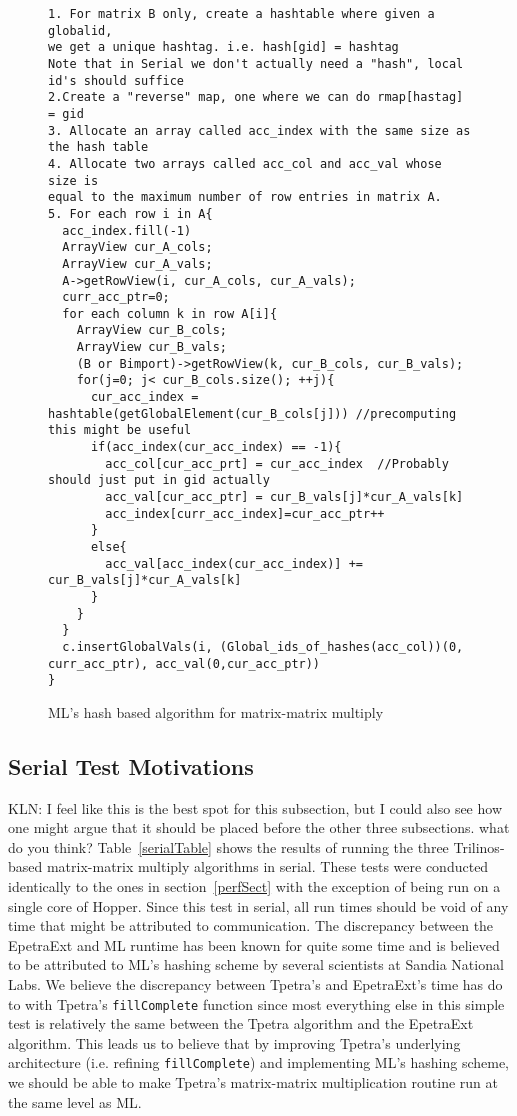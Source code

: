 \documentclass[pdf,12pt, strict]{SANDreport}
\newcommand{\KLN}[1]{\textcolor{klnBlue}{KLN: #1}}
\begin{document}
\begin{figure}
\centering
{\footnotesize
\begin{verbatim}
1. For matrix B only, create a hashtable where given a globalid, 
we get a unique hashtag. i.e. hash[gid] = hashtag
Note that in Serial we don't actually need a "hash", local id's should suffice
2.Create a "reverse" map, one where we can do rmap[hastag] = gid
3. Allocate an array called acc_index with the same size as the hash table
4. Allocate two arrays called acc_col and acc_val whose size is 
equal to the maximum number of row entries in matrix A.
5. For each row i in A{
  acc_index.fill(-1)
  ArrayView cur_A_cols;
  ArrayView cur_A_vals;
  A->getRowView(i, cur_A_cols, cur_A_vals);
  curr_acc_ptr=0;
  for each column k in row A[i]{
    ArrayView cur_B_cols;
    ArrayView cur_B_vals;
    (B or Bimport)->getRowView(k, cur_B_cols, cur_B_vals);
    for(j=0; j< cur_B_cols.size(); ++j){
      cur_acc_index = hashtable(getGlobalElement(cur_B_cols[j])) //precomputing this might be useful
      if(acc_index(cur_acc_index) == -1){
        acc_col[cur_acc_prt] = cur_acc_index  //Probably should just put in gid actually
        acc_val[cur_acc_ptr] = cur_B_vals[j]*cur_A_vals[k]
        acc_index[curr_acc_index]=cur_acc_ptr++
      }
      else{
        acc_val[acc_index(cur_acc_index)] += cur_B_vals[j]*cur_A_vals[k]
      }
    }
  }
  c.insertGlobalVals(i, (Global_ids_of_hashes(acc_col))(0, curr_acc_ptr), acc_val(0,cur_acc_ptr))
}

\end{verbatim}
}
\caption[Hash based algorithm]{ML's hash based algorithm for matrix-matrix multiply}
\label{hashalgo}
\end{figure}

\subsection{Serial Test Motivations}
\KLN{I feel like this is the best spot for this subsection, but I could also see how one might argue that it should be placed before
the other three subsections. what do you think?}
Table~\ref{serialTable} shows the results of running the three Trilinos-based matrix-matrix multiply algorithms in 
serial. These tests were conducted identically to the ones in section~\ref{perfSect} with the exception of being run on a single core of 
Hopper. Since this test in serial, all run times should be void of any time that might be attributed to communication.
The discrepancy between the EpetraExt and ML runtime has been known for quite some time and is believed to be
attributed to ML's hashing scheme by several scientists at Sandia National Labs. We believe the discrepancy between 
Tpetra's and EpetraExt's time has do to with Tpetra's \verb!fillComplete! function since most everything else in this simple test 
is relatively the same between the Tpetra algorithm and the EpetraExt algorithm. This leads us to believe that
by improving Tpetra's underlying architecture (i.e. refining \verb!fillComplete!) and implementing ML's hashing
scheme, we should be able to make Tpetra's matrix-matrix multiplication routine run at the same level as ML.
\end{document}
